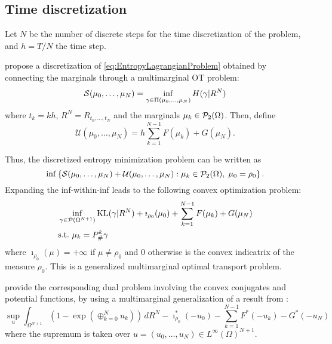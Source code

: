 \documentclass[../report.tex]{subfiles}
\begin{document}
\subsection{Time discretization}

Let $N$ be the number of discrete steps for the time discretization of the problem, and $h=T/N$ the time step.

\textcite{benamou2018entropy} propose a discretization of \eqref{eq:EntropyLagrangianProblem} obtained by connecting the marginals through a multimarginal OT problem:
\begin{equation}
\mathcal{S}(\mu_0,\ldots,\mu_N) =
\inf_{\gamma \in \Pi(\mu_0, \ldots, \mu_N)}
H(\gamma|R^N)
\end{equation}
where $t_k = kh$, $R^N = R_{t_0,\ldots,t_N}$ and the marginals $\mu_k \in \mathcal{P}_2(\Omega)$.
Then, define
\begin{equation}
\mathcal{U}(\mu_0,\ldots,\mu_N) = h\sum_{k=1}^{N-1} F(\mu_k) + G(\mu_N).
\end{equation}

Thus, the discretized entropy minimization problem can be written as
\[
\inf\left\{
\mathcal{S}(\mu_0, \ldots, \mu_N) +
\mathcal{U}(\mu_0, \ldots, \mu_N)
: \mu_k \in \mathcal{P}_2(\Omega),\; \mu_0 = \rho_0
\right\}.
\]
Expanding the inf-within-inf leads to the following convex optimization problem:
\begin{equation}
\begin{aligned}
&\inf_{\gamma \in \mathcal{P}(\Omega^{N+1})}
\operatorname{KL}(\gamma | R^N) + \imath_{\rho_0}(\mu_0) + \sum_{k=1}^{N-1} F(\mu_k) + G(\mu_N) \\
&\mathrm{s.t.}\ \mu_k = P^k_\#\gamma
\end{aligned}
\end{equation}
where $\imath_{\rho_0}(\mu) = +\infty$ if $\mu\neq \rho_0$ and $0$ otherwise is the convex indicatrix of the measure $\rho_0$. This is a generalized multimarginal optimal transport problem.

\textcite{benamou2018entropy} provide the corresponding dual problem involving the convex conjugates and potential functions, by using a multimarginal generalization of a result from \textcite{chizat2016scaling}:
\begin{equation}\label{eq:TimeDiscreteDual}
\sup_u
\int_{\Omega^{N+1}} \left(1-\exp\left(\oplus_{k=0}^N u_k\right)\right) \,dR^N
-\imath_{\rho_0}^*(-u_0) - \sum_{k=1}^{N-1} F^*(-u_k) - G^*(-u_N)
\end{equation}
where the supremum is taken over $u = (u_0,\ldots,u_N) \in L^\infty(\Omega)^{N+1}$.
\end{document}
